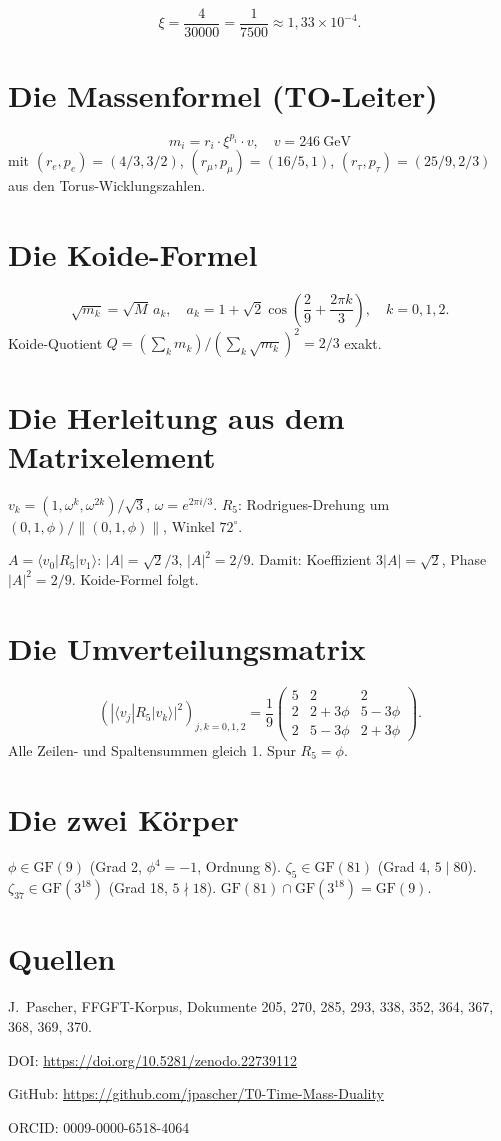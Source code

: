 \documentclass[12pt,oneside]{book}
\begin{document}
\[
\xi = \frac{4}{30000} = \frac{1}{7500} \approx 1{,}33 \times 10^{-4}.
\]

\section{Die Massenformel (TO-Leiter)}

\[
m_i = r_i \cdot \xi^{p_i} \cdot v, \quad v = 246~\text{GeV}
\]
mit $(r_e, p_e) = (4/3, 3/2)$, $(r_\mu, p_\mu) = (16/5, 1)$, $(r_\tau, p_\tau) = (25/9, 2/3)$ aus den Torus-Wicklungszahlen.

\section{Die Koide-Formel}

\[
\sqrt{m_k} = \sqrt{M}\, a_k, \quad a_k = 1 + \sqrt{2} \cos\left(\frac{2}{9} + \frac{2\pi k}{3}\right), \quad k = 0, 1, 2.
\]
Koide-Quotient $Q = (\sum_k m_k)/(\sum_k \sqrt{m_k})^2 = 2/3$ exakt.

\section{Die Herleitung aus dem Matrixelement}

$v_k = (1, \omega^k, \omega^{2k})/\sqrt{3}$, $\omega = e^{2\pi i/3}$. $R_5$: Rodrigues-Drehung um $(0, 1, \phi)/\|(0, 1, \phi)\|$, Winkel $72^\circ$.

$A = \langle v_0 | R_5 | v_1 \rangle$: $|A| = \sqrt{2}/3$, $|A|^2 = 2/9$. Damit: Koeffizient $3|A| = \sqrt{2}$, Phase $|A|^2 = 2/9$. Koide-Formel folgt.

\section{Die Umverteilungsmatrix}

\[
\left(|\langle v_j | R_5 | v_k \rangle|^2\right)_{j,k=0,1,2} = \frac{1}{9}
\begin{pmatrix}
5 & 2 & 2 \\
2 & 2+3\phi & 5-3\phi \\
2 & 5-3\phi & 2+3\phi
\end{pmatrix}.
\]
Alle Zeilen- und Spaltensummen gleich 1. Spur $R_5 = \phi$.

\section{Die zwei Körper}

$\phi \in \text{GF}(9)$ (Grad 2, $\phi^4 = -1$, Ordnung 8). $\zeta_5 \in \text{GF}(81)$ (Grad 4, $5 \mid 80$). $\zeta_{37} \in \text{GF}(3^{18})$ (Grad 18, $5 \nmid 18$). $\text{GF}(81) \cap \text{GF}(3^{18}) = \text{GF}(9)$.

\section{Quellen}

J.~Pascher, FFGFT-Korpus, Dokumente 205, 270, 285, 293, 338, 352, 364, 367, 368, 369, 370.

DOI: \url{https://doi.org/10.5281/zenodo.22739112}

GitHub: \url{https://github.com/jpascher/T0-Time-Mass-Duality}

ORCID: 0009-0000-6518-4064
\end{document}
